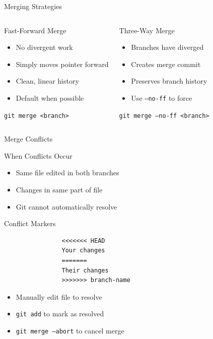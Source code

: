 \documentclass[aspectratio=169]{beamer}
\begin{document}
	\begin{frame}{Merging Strategies}
		\begin{columns}[T]
			\begin{block}{Fast-Forward Merge}
				\begin{itemize}
					\item No divergent work
					\item Simply moves pointer forward
					\item Clean, linear history
					\item Default when possible
				\end{itemize}
				\texttt{git merge \textless branch\textgreater}
			\end{block}
			
			\begin{block}{Three-Way Merge}
				\begin{itemize}
					\item Branches have diverged
					\item Creates merge commit
					\item Preserves branch history
					\item Use \texttt{--no-ff} to force
				\end{itemize}
				\texttt{git merge --no-ff \textless branch\textgreater}
			\end{block}
		\end{columns}
	\end{frame}
	
	\begin{frame}{Merge Conflicts}
		\begin{alertblock}{When Conflicts Occur}
			\begin{itemize}
				\item Same file edited in both branches
				\item Changes in same part of file
				\item Git cannot automatically resolve
			\end{itemize}
		\end{alertblock}
		
		\begin{exampleblock}{Conflict Markers}
			\begin{verbatim}
				<<<<<<< HEAD
				Your changes
				=======
				Their changes
				>>>>>>> branch-name
			\end{verbatim}
		\end{exampleblock}
		
		\begin{itemize}
			\item Manually edit file to resolve
			\item \texttt{git add} to mark as resolved
			\item \texttt{git merge --abort} to cancel merge
		\end{itemize}
	\end{frame}
	
\end{document}
